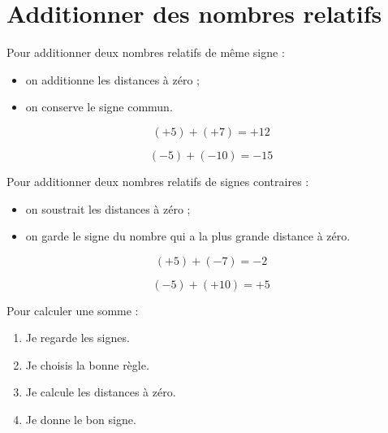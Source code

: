 \section{Additionner des nombres relatifs}

\begin{propbox}

Pour additionner deux nombres relatifs de même signe :

\begin{itemize}
    \item on additionne les distances à zéro ;
    \item on conserve le signe commun.
\end{itemize}
\end{propbox}

\begin{exemplebox}
\[
(+5)+(+7)=+12
\]

\[
(-5)+(-10)=-15
\]
\end{exemplebox}

\begin{propbox}

Pour additionner deux nombres relatifs de signes contraires :

\begin{itemize}
    \item on soustrait les distances à zéro ;
    \item on garde le signe du nombre qui a la plus grande distance à zéro.
\end{itemize}
\end{propbox}

\begin{exemplebox}
\[
(+5)+(-7)=-2
\]

\[
(-5)+(+10)=+5
\]
\end{exemplebox}

\begin{methodebox}
Pour calculer une somme :

\begin{enumerate}
    \item Je regarde les signes.
    \item Je choisis la bonne règle.
    \item Je calcule les distances à zéro.
    \item Je donne le bon signe.
\end{enumerate}
\end{methodebox}

